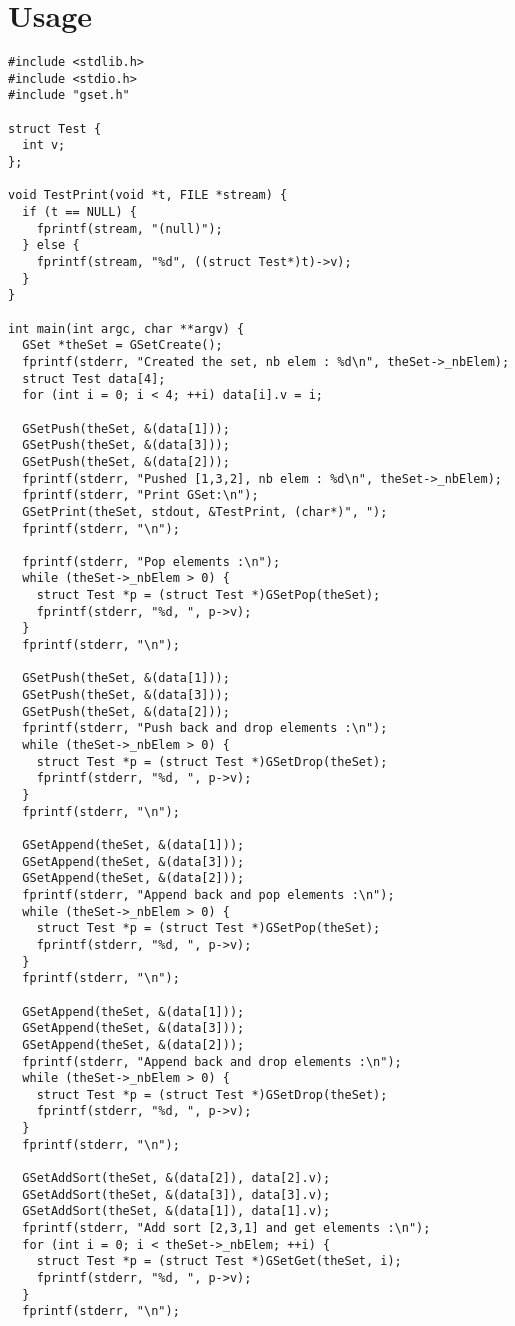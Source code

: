 \documentclass[12pt, a4paper]{article}
\begin{document}
\section{Usage}

\begin{scriptsize}
\begin{ttfamily}
\begin{lstlisting}
#include <stdlib.h>
#include <stdio.h>
#include "gset.h"

struct Test {
  int v;
};

void TestPrint(void *t, FILE *stream) {
  if (t == NULL) {
    fprintf(stream, "(null)");
  } else {
    fprintf(stream, "%d", ((struct Test*)t)->v);
  }
}

int main(int argc, char **argv) {
  GSet *theSet = GSetCreate();
  fprintf(stderr, "Created the set, nb elem : %d\n", theSet->_nbElem);
  struct Test data[4];
  for (int i = 0; i < 4; ++i) data[i].v = i;

  GSetPush(theSet, &(data[1]));
  GSetPush(theSet, &(data[3]));
  GSetPush(theSet, &(data[2]));
  fprintf(stderr, "Pushed [1,3,2], nb elem : %d\n", theSet->_nbElem);
  fprintf(stderr, "Print GSet:\n");
  GSetPrint(theSet, stdout, &TestPrint, (char*)", ");
  fprintf(stderr, "\n");

  fprintf(stderr, "Pop elements :\n");
  while (theSet->_nbElem > 0) {
    struct Test *p = (struct Test *)GSetPop(theSet);
    fprintf(stderr, "%d, ", p->v);
  }
  fprintf(stderr, "\n");

  GSetPush(theSet, &(data[1]));
  GSetPush(theSet, &(data[3]));
  GSetPush(theSet, &(data[2]));
  fprintf(stderr, "Push back and drop elements :\n");
  while (theSet->_nbElem > 0) {
    struct Test *p = (struct Test *)GSetDrop(theSet);
    fprintf(stderr, "%d, ", p->v);
  }
  fprintf(stderr, "\n");

  GSetAppend(theSet, &(data[1]));
  GSetAppend(theSet, &(data[3]));
  GSetAppend(theSet, &(data[2]));
  fprintf(stderr, "Append back and pop elements :\n");
  while (theSet->_nbElem > 0) {
    struct Test *p = (struct Test *)GSetPop(theSet);
    fprintf(stderr, "%d, ", p->v);
  }
  fprintf(stderr, "\n");

  GSetAppend(theSet, &(data[1]));
  GSetAppend(theSet, &(data[3]));
  GSetAppend(theSet, &(data[2]));
  fprintf(stderr, "Append back and drop elements :\n");
  while (theSet->_nbElem > 0) {
    struct Test *p = (struct Test *)GSetDrop(theSet);
    fprintf(stderr, "%d, ", p->v);
  }
  fprintf(stderr, "\n");

  GSetAddSort(theSet, &(data[2]), data[2].v);
  GSetAddSort(theSet, &(data[3]), data[3].v);
  GSetAddSort(theSet, &(data[1]), data[1].v);
  fprintf(stderr, "Add sort [2,3,1] and get elements :\n");
  for (int i = 0; i < theSet->_nbElem; ++i) {
    struct Test *p = (struct Test *)GSetGet(theSet, i);
    fprintf(stderr, "%d, ", p->v);
  }
  fprintf(stderr, "\n");


\end{lstlisting}
\end{ttfamily}
\end{scriptsize}
\end{document}
